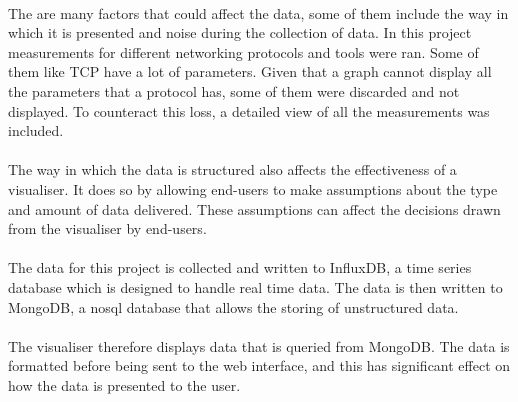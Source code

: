 \paragraph{}
The are many factors that could affect the data, some of them include the way in which it is presented and noise during the collection of data. In this project measurements for different networking protocols and tools were ran. Some of them like TCP have a lot of parameters. Given that a graph cannot display all the parameters that a protocol has, some of them were discarded and not displayed. To counteract this loss, a detailed view of all the measurements was included.
\paragraph{}
The way in which the data is structured also affects the effectiveness of a visualiser. It does so by allowing end-users to make assumptions about the type and amount of data delivered. These assumptions can affect the decisions drawn from the visualiser by end-users\cite{Knight2001}. 
\paragraph{}
The data for this project is collected and written to InfluxDB, a time series database which is designed to handle real time data. The data is then written to MongoDB, a nosql database that allows the storing of unstructured data.
\paragraph{}
The visualiser therefore displays data that is queried from MongoDB. The data is formatted before being sent to the web interface, and this has significant effect on how the data is presented to the user.
\paragraph{}



